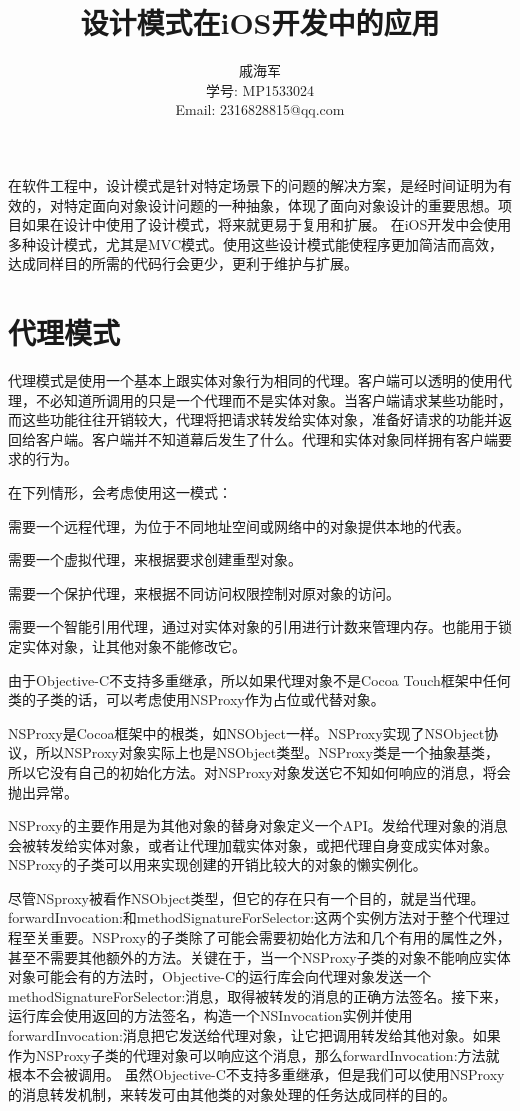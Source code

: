 \documentclass[a4paper, 12pt]{article}
\title{设计模式在iOS开发中的应用}
\author{戚海军 \\学号: MP1533024 \\Email: 2316828815@qq.com}
\date{}
\begin{document}
\maketitle

\section{}
在软件工程中，设计模式是针对特定场景下的问题的解决方案，是经时间证明为有效的，对特定面向对象设计问题的一种抽象，体现了面向对象设计的重要思想。项目如果在设计中使用了设计模式，将来就更易于复用和扩展。
在iOS开发中会使用多种设计模式，尤其是MVC模式。使用这些设计模式能使程序更加简洁而高效，达成同样目的所需的代码行会更少，更利于维护与扩展。

\newpage

\section{代理模式}
代理模式是使用一个基本上跟实体对象行为相同的代理。客户端可以透明的使用代理，不必知道所调用的只是一个代理而不是实体对象。当客户端请求某些功能时，而这些功能往往开销较大，代理将把请求转发给实体对象，准备好请求的功能并返回给客户端。客户端并不知道幕后发生了什么。代理和实体对象同样拥有客户端要求的行为。

在下列情形，会考虑使用这一模式：

需要一个远程代理，为位于不同地址空间或网络中的对象提供本地的代表。

需要一个虚拟代理，来根据要求创建重型对象。

需要一个保护代理，来根据不同访问权限控制对原对象的访问。

需要一个智能引用代理，通过对实体对象的引用进行计数来管理内存。也能用于锁定实体对象，让其他对象不能修改它。

由于Objective-C不支持多重继承，所以如果代理对象不是Cocoa Touch框架中任何类的子类的话，可以考虑使用NSProxy作为占位或代替对象。

NSProxy是Cocoa框架中的根类，如NSObject一样。NSProxy实现了NSObject协议，所以NSProxy对象实际上也是NSObject类型。NSProxy类是一个抽象基类，所以它没有自己的初始化方法。对NSProxy对象发送它不知如何响应的消息，将会抛出异常。

NSProxy的主要作用是为其他对象的替身对象定义一个API。发给代理对象的消息会被转发给实体对象，或者让代理加载实体对象，或把代理自身变成实体对象。NSProxy的子类可以用来实现创建的开销比较大的对象的懒实例化。

尽管NSproxy被看作NSObject类型，但它的存在只有一个目的，就是当代理。forwardInvocation:和methodSignatureForSelector:这两个实例方法对于整个代理过程至关重要。NSProxy的子类除了可能会需要初始化方法和几个有用的属性之外，甚至不需要其他额外的方法。关键在于，当一个NSProxy子类的对象不能响应实体对象可能会有的方法时，Objective-C的运行库会向代理对象发送一个methodSignatureForSelector:消息，取得被转发的消息的正确方法签名。接下来，运行库会使用返回的方法签名，构造一个NSInvocation实例并使用forwardInvocation:消息把它发送给代理对象，让它把调用转发给其他对象。如果作为NSProxy子类的代理对象可以响应这个消息，那么forwardInvocation:方法就根本不会被调用。
虽然Objective-C不支持多重继承，但是我们可以使用NSProxy的消息转发机制，来转发可由其他类的对象处理的任务达成同样的目的。
\end{document}
